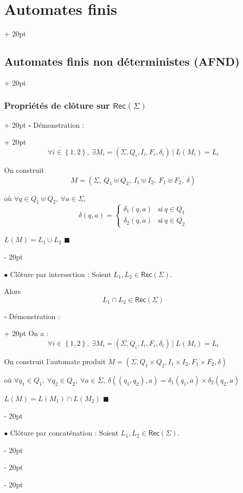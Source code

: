 \documentclass[a4paper, 12pt, twoside]{article}
\newcommand{\lr}[1]{\left( #1 \right)}
\newcommand{\set}[1]{\left\{ #1 \right\}}
\newcommand{\ind}[1][20pt]{\advance\leftskip + #1}
\newcommand{\deind}[1][20pt]{\advance\leftskip - #1}
\newenvironment{indt}[2][20pt]{#2 \par \ind[#1]}{\par \deind} %
\newenvironment{proof}[1][{Démonstration :}]{\begin{indt}{$\square$ #1}}{$\blacksquare$ \end{indt}}
\newcommand{\Rec}[1]{\mathsf{Rec}\!\lr{#1}}
\begin{document}
\begin{indt}{\section{Automates finis}}
\begin{indt}{\subsection{Automates finis non déterministes (AFND)}}
\begin{indt}{\subsubsection{Propriétés de clôture sur $\Rec \Sigma$}}
\begin{proof}
                    \[
                        \forall i \in \set{1, 2},\ \exists M_i = (\Sigma, Q_i, I_i, F_i, \delta_i)\ |\ L(M_i) = L_i
                    \]

                    On construit
                    \[
                        M = \lr{\Sigma,\ Q_1 \uplus Q_2,\ I_1 \uplus I_2,\ F_1 \uplus F_2,\ \delta}
                    \]

                    où $\forall q \in Q_1 \uplus Q_2,\ \forall a \in \Sigma,$
                    \[
                        \delta(q, a) =
                        \begin{cases}
                            \delta_1(q, a)
                            & \text{si}\ q \in Q_1
                            \\
                            \delta_2(q, a)
                            & \text{si}\ q \in Q_2
                        \end{cases}
                    \]

                     $L(M) = L_1 \cup L_2$
                \end{proof}

                \vspace{12pt}
                
                $\bullet$ Clôture par intersection :
                Soient $L_1, L_2 \in \Rec \Sigma$.

                Alors
                \[
                    L_1 \cap L_2 \in \Rec \Sigma
                \]

                \begin{proof}
                    On a :
                    \[
                        \forall i \in \set{1, 2},\ \exists M_i = (\Sigma, Q_i, I_i, F_i, \delta_i)\ |\ L(M_i) = L_i
                    \]

                    On construit l'automate produit $M = (\Sigma, Q_1 \times Q_2, I_1 \times I_2, F_1 \times F_2, \delta)$

                    où $\forall q_1 \in Q_1,\ \forall q_2 \in Q_2,\ \forall a \in \Sigma,\ \delta((q_1, q_2), a) = \delta_1(q_1, a) \times \delta_2(q_2, a)$

                     $L(M) = L(M_1) \cap L(M_2)$
                \end{proof}

                \vspace{12pt}
                
                $\bullet$ Clôture par concaténation : Soient $L_1, L_2 \in \Rec \Sigma$.


\end{indt}
\end{indt}
\end{indt}
\end{document}
